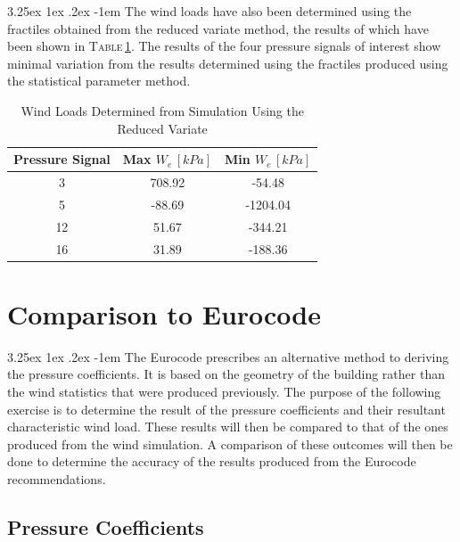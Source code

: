 \documentclass[11pt,a4paper,titlepage]{report}
\makeatletter
\renewcommand\paragraph{\@startsection{paragraph}{5}{\z@}%
  {3.25ex \@plus1ex \@minus.2ex}%
  {-1em}%
  {\normalfont\normalsize\bfseries}}
\makeatother
\begin{document}
\paragraph{}The wind loads have also been determined using the fractiles obtained from the reduced variate method, the results of which have been shown in \textsc{Table}\,\ref{tab:wind loads sim reduced variate}. The results of the four pressure signals of interest show minimal variation from the results determined using the fractiles produced using the statistical parameter method. 
\begin{table}[h]
    \centering
    \begin{tabular}{c|c|c}
      Pressure Signal & Max $W_e\,[kPa]$ & Min $W_e\,[kPa]$ \\
      \hline
   3  & 708.92 & -54.48   \\
5  & -88.69 & -1204.04 \\
12 & 51.67  & -344.21  \\
16 & 31.89  & -188.36 
    \end{tabular}
    \caption{Wind Loads Determined from Simulation Using the Reduced Variate}
    \label{tab:wind loads sim reduced variate}
\end{table}
\section{Comparison to Eurocode}
\paragraph{}The Eurocode prescribes an alternative method to deriving the pressure coefficients. It is based on the geometry of the building rather than the wind statistics that were produced previously. The purpose of the following exercise is to determine the result of the pressure coefficients and their resultant characteristic wind load. These results will then be compared to that of the ones produced from the wind simulation. A comparison of these outcomes will then be done to determine the accuracy of the results produced from the Eurocode recommendations. 
\subsection{Pressure Coefficients}
\end{document}

